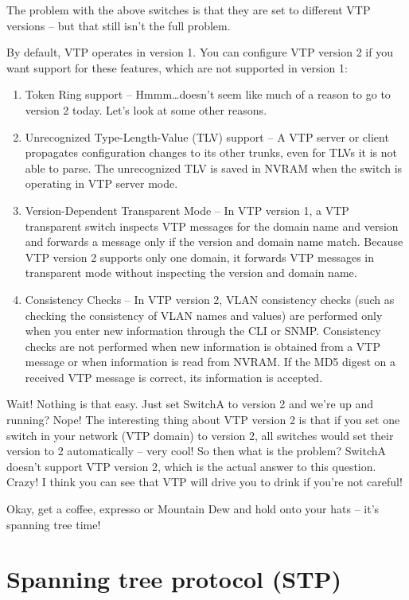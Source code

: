 The problem with the above switches is that they are set to different
VTP versions -- but that still isn't the full problem.

By default, VTP
operates in version 1. You can configure VTP version 2 if you want
support for these features, which are not supported in version 1:

\begin{enumerate}
\item
  Token Ring support -- Hmmm\ldots doesn't seem like much of a reason to
  go to version 2 today. Let's look at some other reasons.
\item
  Unrecognized Type-Length-Value (TLV) support -- A VTP server or client
  propagates configuration changes to its other trunks, even for TLVs it
  is not able to parse. The unrecognized TLV is saved in NVRAM when the
  switch is operating in VTP server mode.
\item
  Version-Dependent Transparent Mode -- In VTP version 1, a VTP
  transparent switch inspects VTP messages for the domain name and
  version and forwards a message only if the version and domain name
  match. Because VTP version 2 supports only one domain, it forwards VTP
  messages in transparent mode without inspecting the version and domain
  name.
\item
  Consistency Checks -- In VTP version 2, VLAN consistency checks (such
  as checking the consistency of VLAN names and values) are performed
  only when you enter new information through the CLI or SNMP.
  Consistency checks are not performed when new information is obtained
  from a VTP message or when information is read from NVRAM. If the MD5
  digest on a received VTP message is correct, its information is
  accepted.
\end{enumerate}

Wait! Nothing is that easy. Just set SwitchA to version 2 and we're up
and running? Nope! The interesting thing about VTP version 2 is that if
you set one switch in your network (VTP domain) to version 2, all
switches would set their version to 2 automatically -- very cool! So then
what is the problem? SwitchA doesn't support VTP version 2, which is the
actual answer to this question. Crazy! I think you can see that VTP will
drive you to drink if you're not careful!

Okay, get a coffee, expresso or Mountain Dew and hold onto your
hats -- it's spanning tree time!

\section{Spanning tree protocol (STP)}

